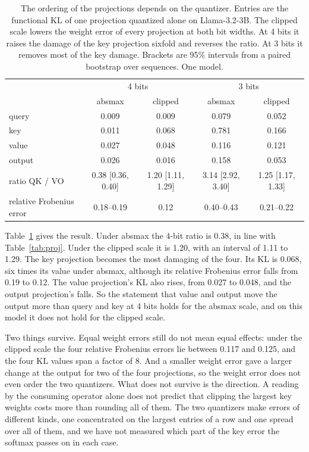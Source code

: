 \documentclass[10pt]{article}
\newcommand{\KL}{\mathrm{KL}}
\begin{document}
\begin{table}[t]
\centering
\small
\begin{tabular}{lcccc}
\toprule
 & \multicolumn{2}{c}{4 bits} & \multicolumn{2}{c}{3 bits} \\
 & absmax & clipped & absmax & clipped \\
\midrule
query & 0.009 & 0.009 & 0.079 & 0.052 \\
key & 0.011 & 0.068 & 0.781 & 0.166 \\
value & 0.027 & 0.048 & 0.116 & 0.121 \\
output & 0.026 & 0.016 & 0.158 & 0.053 \\
ratio QK / VO & 0.38 [0.36, 0.40] & 1.20 [1.11, 1.29] & 3.14 [2.92, 3.40] & 1.25 [1.17, 1.33] \\
relative Frobenius error & 0.18--0.19 & 0.12 & 0.40--0.43 & 0.21--0.22 \\
\bottomrule
\end{tabular}
\caption{The ordering of the projections depends on the quantizer. Entries are the functional
$\KL$ of one projection quantized alone on Llama-3.2-3B. The clipped scale lowers the weight
error of every projection at both bit widths. At 4 bits it raises the damage of the key
projection sixfold and reverses the ratio. At 3 bits it removes most of the key damage. Brackets
are 95\% intervals from a paired bootstrap over sequences. One model.}
\label{tab:quant}
\end{table}

Table~\ref{tab:quant} gives the result. Under absmax the 4-bit ratio is 0.38, in line with
Table~\ref{tab:proj}. Under the clipped scale it is 1.20, with an interval of 1.11 to 1.29. The
key projection becomes the most damaging of the four. Its $\KL$ is 0.068, six times its value
under absmax, although its relative Frobenius error falls from 0.19 to 0.12. The value
projection's $\KL$ also rises, from 0.027 to 0.048, and the output projection's falls. So the
statement that value and output move the output more than query and key at 4 bits holds for the
absmax scale, and on this model it does not hold for the clipped scale.

Two things survive. Equal weight errors still do not mean equal effects: under the clipped scale
the four relative Frobenius errors lie between 0.117 and 0.125, and the four $\KL$ values span a
factor of 8. And a smaller weight error gave a larger change at the output for two of the four
projections, so the weight error does not even order the two quantizers. What does not survive
is the direction. A reading by the consuming operator alone does not predict that clipping the
largest key weights costs more than rounding all of them. The two quantizers make errors of
different kinds, one concentrated on the largest entries of a row and one spread over all of
them, and we have not measured which part of the key error the softmax passes on in each case.
\end{document}
